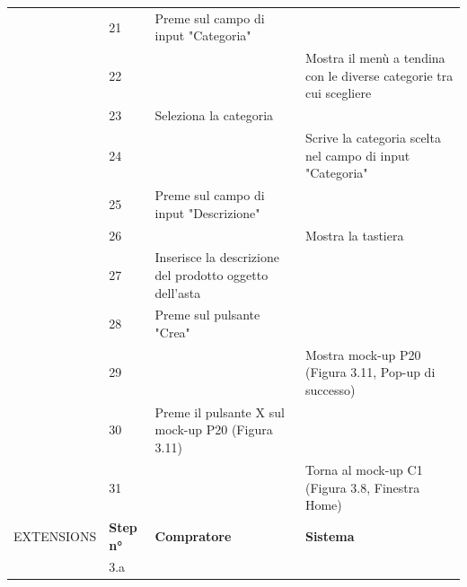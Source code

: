 \begin{longtable}{|C{3.0cm}|C{1.3cm}|L{5.2cm}|L{5.2cm}|}
                        & 21
                        & Preme sul campo di input "Categoria"
                        & \\
                        & 22
                        &
                        & Mostra il menù a tendina con le diverse categorie tra cui scegliere \\
                        & 23
                        & Seleziona la categoria
                        & \\
                        & 24
                        & 
                        & Scrive la categoria scelta nel campo di input "Categoria"\\
                        & 25
                        & Preme sul campo di input "Descrizione"
                        & \\
                        & 26
                        &
                        & Mostra la tastiera \\
                        & 27
                        & Inserisce la descrizione del prodotto oggetto dell'asta
                        & \\
                        & 28
                        & Preme sul pulsante "Crea"
                        & \\
                        & 29
                        & 
                        & Mostra mock-up P20 (Figura 3.11, Pop-up di successo)\\
                        & 30
                        & Preme il pulsante X sul mock-up P20 (Figura 3.11)
                        & \\
                        & 31
                        & 
                        & Torna al mock-up C1 (Figura 3.8, Finestra Home)\\
                \hline
                    EXTENSIONS
                    & \textbf{Step n°} 
                    & \textbf{Compratore} 
                    & \textbf{Sistema}\\
                \hline
                        & 3.a

\end{longtable}
